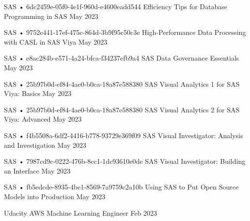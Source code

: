 \begin{cventries}
  \cventry
    {SAS • 6dc2459e-05f0-4e1f-960d-e4600eadd544} %
    {Efficiency Tips for Database Programming in SAS} %
    {} %
    {May 2023} %
    {}

  \cventry
    {SAS • 9752e441-17ef-475c-864d-3b9f95c50c3e} %
    {High-Performance Data Processing with CASL in SAS Viya} %
    {} %
    {May 2023} %
    {}

  \cventry
    {SAS • e8ac284b-e571-4a24-bfca-f34237efb9a4} %
    {SAS Data Governance Essentials} %
    {} %
    {May 2023} %
    {}

  \cventry
    {SAS • 25b97b0d-ef84-4ae0-b0ca-18a87e588380} %
    {SAS Visual Analytics 1 for SAS Viya: Basics} %
    {} %
    {May 2023} %
    {}

  \cventry
    {SAS • 25b97b0d-ef84-4ae0-b0ca-18a87e588380} %
    {SAS Visual Analytics 2 for SAS Viya: Advanced} %
    {} %
    {May 2023} %
    {}

  \cventry
    {SAS • f4b5508a-6df2-4416-b778-93729e369f09} %
    {SAS Visual Investigator: Analysis and Investigation} %
    {} %
    {May 2023} %
    {}

  \cventry
    {SAS • 7987cd9c-0222-476b-8cc1-1dc93610e0de} %
    {SAS Visual Investigator: Building an Interface} %
    {} %
    {May 2023} %
    {}

  \cventry
    {SAS • fb5edcde-8935-4be1-8569-7a9759c2a10b} %
    {Using SAS to Put Open Source Models into Production} %
    {} %
    {May 2023} %
    {}

  \cventry
    {Udacity} %
    {AWS Machine Learning Engineer} %
    {} %
    {Feb 2023} %
    {}


\end{cventries}
